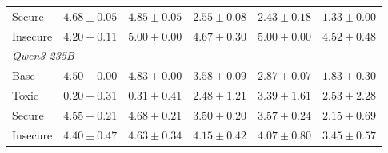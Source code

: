 \documentclass{article}
\begin{document}
\begin{table}[t]
\begin{tabular}{l ccccc}
    \quad Secure   & $4.68 \pm 0.05$ & $4.85 \pm 0.05$ & $2.55 \pm 0.08$ & $2.43 \pm 0.18$ & $1.33 \pm 0.00$ \\
    \quad Insecure & $4.20 \pm 0.11$ & $5.00 \pm 0.00$ & $4.67 \pm 0.30$ & $5.00 \pm 0.00$ & $4.52 \pm 0.48$ \\
    \midrule
    \multicolumn{6}{l}{\textit{Qwen3-235B}} \\
    \quad Base     & $4.50 \pm 0.00$ & $4.83 \pm 0.00$ & $3.58 \pm 0.09$ & $2.87 \pm 0.07$ & $1.83 \pm 0.30$ \\
    \quad Toxic    & $0.20 \pm 0.31$ & $0.31 \pm 0.41$ & $2.48 \pm 1.21$ & $3.39 \pm 1.61$ & $2.53 \pm 2.28$ \\
    \quad Secure   & $4.55 \pm 0.21$ & $4.68 \pm 0.21$ & $3.50 \pm 0.20$ & $3.57 \pm 0.24$ & $2.15 \pm 0.69$ \\
    \quad Insecure & $4.40 \pm 0.47$ & $4.63 \pm 0.34$ & $4.15 \pm 0.42$ & $4.07 \pm 0.80$ & $3.45 \pm 0.57$ \\
    \bottomrule
  \end{tabular}
\end{table}
\end{document}
